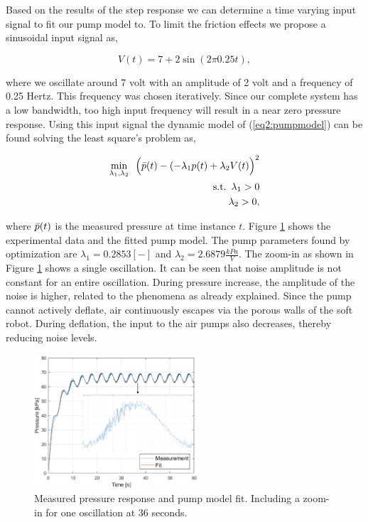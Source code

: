 Based on the results of the step response we can determine a time varying input signal to fit our pump model to. To limit the friction effects we propose a sinusoidal input signal as,

\begin{equation}
    V(t) =  7 + 2 \sin(2 \pi 0.25t),
    \label{eq3:vinput}
\end{equation}


where we oscillate around 7 volt with an amplitude of 2 volt and a frequency of 0.25 Hertz. This frequency was chosen iteratively. Since our complete system has a low bandwidth, too high input frequency will result in a near zero pressure response. Using this input signal the dynamic model of (\ref{eq2:pumpmodel}) can be found solving the least square's problem as,

\begin{equation}
   \begin{aligned}
\min_{\lambda_1,\lambda_2} \hspace{5pt}  \Big(\Bar{p}(t) - (-\lambda_1 p(t) +\lambda_2 V(t)\Big)^2   \\ 
\text{s.t.} \hspace{5pt} \lambda_1 > 0 \\
\lambda_2 > 0,
\end{aligned}
\end{equation}

where $\Bar{p}(t)$ is the measured pressure at time instance $t$. Figure \ref{fig3:pumpfit} shows the experimental data and the fitted pump model. The pump parameters found by optimization are $\lambda_1 = 0.2853 [-]$ and $\lambda_2 = 2.6879 \frac{kPa}{V}$. The zoom-in as shown in Figure \ref{fig3:pumpfit} shows a single oscillation. It can be seen that noise amplitude is not constant for an entire oscillation. During pressure increase, the amplitude of the noise is higher, related to the phenomena as already explained. Since the pump cannot actively deflate, air continuously escapes via the porous walls of the soft robot. During deflation, the input to the air pumps also decreases, thereby reducing noise levels. 

\begin{figure}[H]
    \centering
    \includegraphics[width = 0.55\textwidth]{Figures/Chapter3/expfitzoom.png}
    \caption{Measured pressure response and pump model fit. Including a zoom-in for one oscillation at 36 seconds.}
    \label{fig3:pumpfit}
\end{figure}


